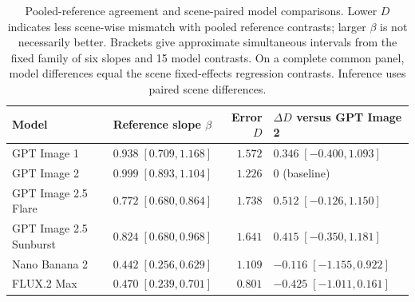 \begin{table}[tbp]
\centering\small\setlength{\tabcolsep}{4pt}
\begin{tabularx}{\linewidth}{@{}>{\raggedright\arraybackslash}p{.24\linewidth}>{\raggedright\arraybackslash}Xr>{\raggedright\arraybackslash}X@{}}
\toprule
Model & Reference slope $\beta$ & Error $D$ & $\Delta D$ versus GPT Image 2\\
\midrule
GPT Image 1 & $0.938\;[0.709,1.168]$ & $1.572$ & $0.346\;[-0.400,1.093]$\\[3pt]
GPT Image 2 & $0.999\;[0.893,1.104]$ & $1.226$ & $0$ (baseline)\\[3pt]
GPT Image 2.5 Flare & $0.772\;[0.680,0.864]$ & $1.738$ & $0.512\;[-0.126,1.150]$\\[3pt]
GPT Image 2.5 Sunburst & $0.824\;[0.680,0.968]$ & $1.641$ & $0.415\;[-0.350,1.181]$\\[3pt]
Nano Banana 2 & $0.442\;[0.256,0.629]$ & $1.109$ & $-0.116\;[-1.155,0.922]$\\[3pt]
FLUX.2 Max & $0.470\;[0.239,0.701]$ & $0.801$ & $-0.425\;[-1.011,0.161]$\\[3pt]
\bottomrule\end{tabularx}
\caption{Pooled-reference agreement and scene-paired model comparisons. Lower $D$ indicates less scene-wise mismatch with pooled reference contrasts; larger $\beta$ is not necessarily better. Brackets give approximate simultaneous intervals from the fixed family of six slopes and 15 model contrasts. On a complete common panel, model differences equal the scene fixed-effects regression contrasts. Inference uses paired scene differences.}
\label{tab:specificity-models}\end{table}
